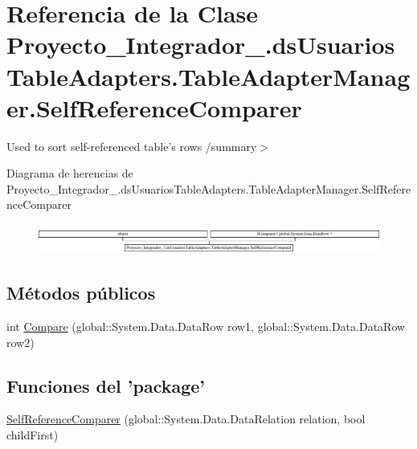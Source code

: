 \hypertarget{class_proyecto___integrador__3_1_1ds_usuarios_table_adapters_1_1_table_adapter_manager_1_1_self_reference_comparer}{\section{Referencia de la Clase Proyecto\-\_\-\-Integrador\-\_.\-ds\-Usuarios\-Table\-Adapters.\-Table\-Adapter\-Manager.\-Self\-Reference\-Comparer}
\label{class_proyecto___integrador__3_1_1ds_usuarios_table_adapters_1_1_table_adapter_manager_1_1_self_reference_comparer}
}


Used to sort self-\/referenced table's rows /summary$>$  


Diagrama de herencias de Proyecto\-\_\-\-Integrador\-\_.\-ds\-Usuarios\-Table\-Adapters.\-Table\-Adapter\-Manager.\-Self\-Reference\-Comparer\begin{figure}[H]
\begin{center}
\leavevmode
\includegraphics[height=0.982456cm]{d9/dfc/class_proyecto___integrador__3_1_1ds_usuarios_table_adapters_1_1_table_adapter_manager_1_1_self_reference_comparer}
\end{center}
\end{figure}
\subsection*{Métodos públicos}
\begin{DoxyCompactItemize}
\item 
int \hyperlink{class_proyecto___integrador__3_1_1ds_usuarios_table_adapters_1_1_table_adapter_manager_1_1_self_reference_comparer_a78c217a295562cf7990f8af9d8dd393c}{Compare} (global\-::\-System.\-Data.\-Data\-Row row1, global\-::\-System.\-Data.\-Data\-Row row2)
\end{DoxyCompactItemize}
\subsection*{Funciones del 'package'}
\begin{DoxyCompactItemize}
\item 
\hyperlink{class_proyecto___integrador__3_1_1ds_usuarios_table_adapters_1_1_table_adapter_manager_1_1_self_reference_comparer_a48369f8c120506a95bdb9be253dddd7d}{Self\-Reference\-Comparer} (global\-::\-System.\-Data.\-Data\-Relation relation, bool child\-First)
\end{DoxyCompactItemize}
